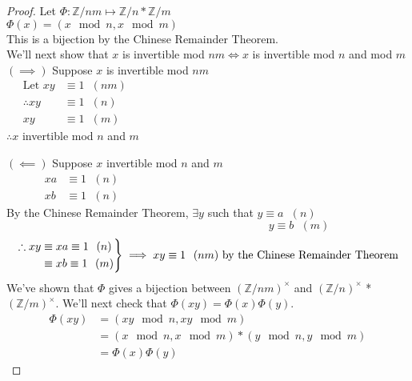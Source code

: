 \documentclass[11pt]{article}
\newenvironment{rcurly}{\left.\begin{aligned}}{\end{aligned}\right\rbrace}
\begin{document}
\begin{proof}
	Let $\Phi: \mathbb{Z}/nm \mapsto \mathbb{Z}/n * \mathbb{Z}/m$\\
	\hspace{30pt} $\Phi(x) = (x\mod n, x \mod m)$ \\
	\hspace{30pt} This is a bijection by the Chinese Remainder Theorem.\\
	\hspace{30pt} We'll next show that $x$ is invertible mod $nm \iff x$ is invertible mod $n$ and mod $m$
	$(\implies)$ Suppose $x$ is invertible mod $nm$ 
	\begin{align*}
		\text{Let } xy &\equiv 1\hspace{7pt}(nm) \hspace{285pt}\\
		\therefore xy & \equiv 1\hspace{7pt} (n)\\
		xy &\equiv 1 \hspace{7pt} (m)
	\end{align*}
	\hspace{34pt} $\therefore x$ invertible mod $n$ and $m$ 

	$(\impliedby) $ Suppose $x$ invertible mod $n$ and $m$
	\begin{align*}
		xa &\equiv 1\hspace{7pt} (n)\\
		xb &\equiv 1\hspace{7pt} (n)\hspace{270pt}
	\end{align*}
	\hspace{36pt}By the Chinese Remainder Theorem, $\exists y$ such that $y \equiv a\hspace{7pt} (n)$\\ 
	$\hspace{281pt} y \equiv b \hspace{7pt} (m)$
\begin{equation*}
\begin{rcurly}
	\therefore xy &\equiv xa \equiv 1\hspace{7pt} (n)\\
	&\equiv xb \equiv 1  \hspace{7pt} (m) \\
\end{rcurly}
	\implies xy \equiv 1 \hspace{7pt}  (nm) \text{    by the Chinese Remainder Theorem} 
\end{equation*}
	We've shown that $\Phi$ gives a bijection between $(\mathbb{Z}/nm)^\times$ and $(\mathbb{Z}/n)^\times$ * $(\mathbb{Z}/m)^\times$. We'll next check that $\Phi (xy) = \Phi (x) \Phi (y)$.\\
	\begin{align*}
		\Phi(xy) &= (xy \mod n, xy \mod m)\\
		& =(x \mod n , x \mod m) * (y \mod n, y \mod m)\\
		&= \Phi (x) \Phi(y)
	\end{align*}
\end{proof}
\end{document}
